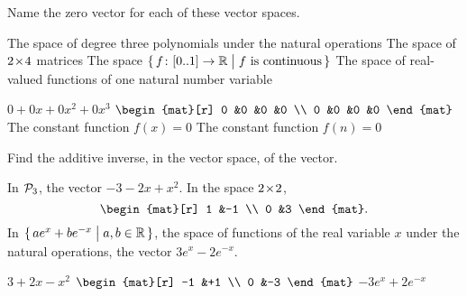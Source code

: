 \begin{exercises}
  \item 
    Name the zero vector for each of these vector spaces.
    \begin{exparts}
      \partsitem The space of degree three polynomials under the natural
        operations
      \partsitem The space of \( 2 \! \times \! 4 \) matrices
      \partsitem The space
        \( \mbox{$\{\,\mbox{$f\colon [0..1]\to \mathbb{R}$}\bigm| f\text{ is continuous}\,\}$} \)
      \partsitem The space of real-valued functions of one natural 
        number variable
    \end{exparts}
    \begin{answer}
      \begin{exparts}
        \partsitem \( 0+0x+0x^2+0x^3 \)
        \partsitem \( \begin{mat}[r]
                   0  &0  &0  &0  \\
                   0  &0  &0  &0
                 \end{mat} \)
        \partsitem The constant function \( f(x)=0 \)
        \partsitem The constant function \( f(n)=0 \)
      \end{exparts}  
    \end{answer}
  \recommended \item
    Find the additive inverse, in the vector space,
    of the vector.
    \begin{exparts}
      \partsitem In \( \mathcal{P}_3 \), the vector \( -3-2x+x^2 \).
      \partsitem In the space \( 2 \! \times \! 2 \),
        \begin{equation*}
          \begin{mat}[r]
            1  &-1  \\
            0  &3
          \end{mat}.
        \end{equation*}
     \partsitem In \( \mbox{$\{\,ae^x+be^{-x}\bigm| a,b\in\mathbb{R}\,\}$} \), the space 
       of functions of the real variable \( x \) under the natural operations,
       the vector \( 3e^x-2e^{-x} \).
    \end{exparts}
    \begin{answer}
      \begin{exparts*}
        \partsitem \( 3+2x-x^2 \)
        \partsitem \( \begin{mat}[r]
                   -1  &+1  \\
                    0  &-3
                 \end{mat} \)
        \partsitem \( -3e^x+2e^{-x} \)

\end{exparts*}
\end{answer}
\end{exercises}
